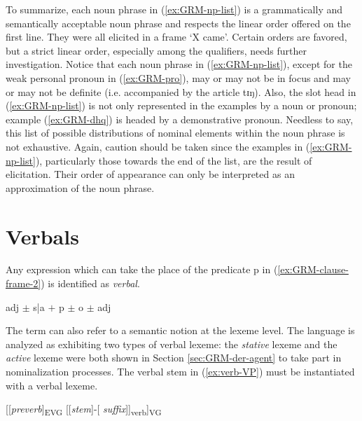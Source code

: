 \begin{exe}
\begin{exe}
\begin{exe}
{\begin{exe}
\begin{exe}
\begin{exe}
\begin{exe}
\begin{exe}
\begin{exe}
\begin{exe}
\begin{exe}
\begin{exe}
\begin{exe}
\begin{exe}
\begin{exe}
\begin{exe}
\begin{exe}
\begin{exe}
\begin{exe}
\begin{exe}
\begin{exe}
\begin{exe}
 
\z 
 \z
 
 
 To summarize, each noun phrase in (\ref{ex:GRM-np-list}) is a grammatically and semantically 
acceptable noun phrase and  respects the linear order offered on the first line. They were all 
elicited in a frame `X came'.  Certain orders are favored, but a strict linear order, especially 
among the qualifiers, needs further investigation.   Notice that each noun phrase in 
(\ref{ex:GRM-np-list}), except for the weak personal pronoun in (\ref{ex:GRM-pro}),  may or may not 
be in focus and may or may not be definite (i.e. accompanied by the article {\sls tɪŋ}). Also,  the 
slot {\sc head}  in (\ref{ex:GRM-np-list}) is not only represented in the examples by a noun or 
pronoun;  
example (\ref{ex:GRM-dhq}) is headed by a demonstrative pronoun. Needless to say, this list of 
possible distributions of nominal elements within the noun phrase is not exhaustive. Again, caution 
should be taken since the examples in (\ref{ex:GRM-np-list}), particularly those towards the end of 
the list, are the result of elicitation. Their order of appearance can only be  interpreted  as  an 
approximation of the noun phrase. 



\section{Verbals}
\label{sec:GRM-verbals}

% 
Any expression which can take
the place of  the predicate {\sc p} in  (\ref{ex:GRM-clause-frame-2}) is 
identified as  \textit{verbal}.


\begin{exe}
  \ex\label{ex:GRM-clause-frame-2}\label{ex:GRM-clause-frame-2}
 {\sc adj}  $\pm$ {\sc s|a}  $+$ {\sc p} $\pm$ {\sc o} $\pm$ {\sc adj} 
\end{exe}


The term  can also refer to a semantic notion at the lexeme 
level. The language is analyzed as exhibiting two types of verbal lexeme: the 
{\it stative} lexeme and the {\it active} lexeme were both shown in Section 
\ref{sec:GRM-der-agent} to take  part in 
nominalization processes. The verbal stem in (\ref{ex:verb-VP})  must be 
instantiated with a verbal lexeme. 

\ea\label{ex:verb-VP}
[[{\it preverb}]\textsubscript{EVG} [[{\it stem}]-[{\it 
suffix}]]\textsubscript{verb}]\textsubscript{VG}
\z



\end{exe}
\end{exe}
\end{exe}
\end{exe}
\end{exe}
\end{exe}
\end{exe}
\end{exe}
\end{exe}
\end{exe}
\end{exe}
\end{exe}
\end{exe}
\end{exe}
\end{exe}
\end{exe}
\end{exe}
\end{exe}
\end{exe}}
\end{exe}
\end{exe}
\end{exe}
